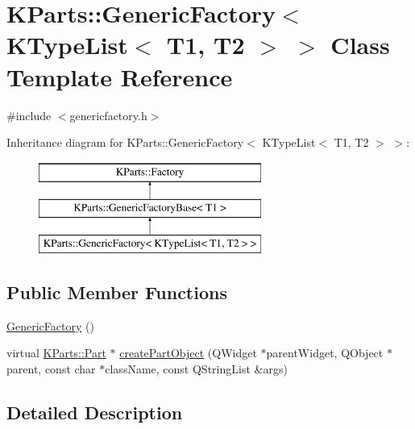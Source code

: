 \hypertarget{classKParts_1_1GenericFactory_3_01KTypeList_3_01T1_00_01T2_01_4_01_4}{\section{\-K\-Parts\-:\-:\-Generic\-Factory$<$ \-K\-Type\-List$<$ \-T1, \-T2 $>$ $>$ \-Class \-Template \-Reference}
\label{classKParts_1_1GenericFactory_3_01KTypeList_3_01T1_00_01T2_01_4_01_4}
}


{\ttfamily \#include $<$genericfactory.\-h$>$}

\-Inheritance diagram for \-K\-Parts\-:\-:\-Generic\-Factory$<$ \-K\-Type\-List$<$ \-T1, \-T2 $>$ $>$\-:\begin{figure}[H]
\begin{center}
\leavevmode
\includegraphics[height=3.000000cm]{classKParts_1_1GenericFactory_3_01KTypeList_3_01T1_00_01T2_01_4_01_4}
\end{center}
\end{figure}
\subsection*{\-Public \-Member \-Functions}
\begin{DoxyCompactItemize}
\item 
\hyperlink{classKParts_1_1GenericFactory_3_01KTypeList_3_01T1_00_01T2_01_4_01_4_addfaf3065f16712d09a7a63bee3fd116}{\-Generic\-Factory} ()
\item 
virtual \hyperlink{classKParts_1_1Part}{\-K\-Parts\-::\-Part} $\ast$ \hyperlink{classKParts_1_1GenericFactory_3_01KTypeList_3_01T1_00_01T2_01_4_01_4_aa3e8c27c10a09306951a2e63159a3d56}{create\-Part\-Object} (\-Q\-Widget $\ast$parent\-Widget, \-Q\-Object $\ast$parent, const char $\ast$class\-Name, const \-Q\-String\-List \&args)
\end{DoxyCompactItemize}


\subsection{\-Detailed \-Description}
